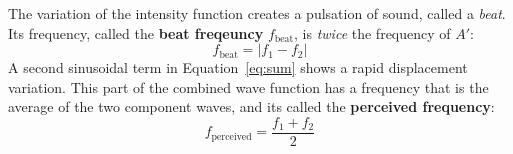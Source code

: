 \documentclass{../../oss-handout}
\begin{document}
The variation of the intensity function creates a pulsation of sound, called a
\emph{beat}. Its frequency, called the \textbf{beat freqeuncy} $f_\text{beat}$,
is \emph{twice} the frequency of $A'$:
\begin{equation}
  \boxed{f_\text{beat}=|f_1-f_2|}
\end{equation}
A second sinusoidal term in Equation~\ref{eq:sum} shows a rapid displacement
variation. This part of the combined wave function has a frequency that is the
average of the two component waves, and its called the \textbf{perceived
  frequency}:
\begin{equation}
  \boxed{f_\text{perceived}=\frac{f_1+f_2}2}
\end{equation}
\end{document}
